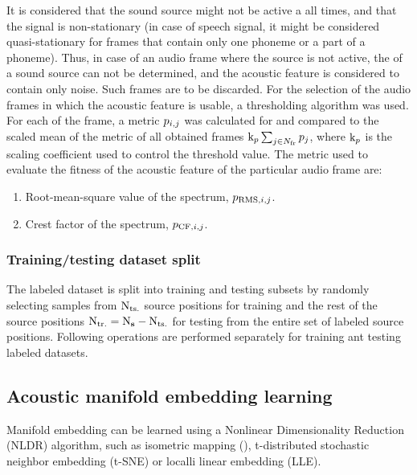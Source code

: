 \documentclass[applsci,article,submit,moreauthors,pdftex]{Definitions/mdpi}
\begin{document}
It is considered that the sound source might not be active a all times, and that the signal is non-stationary (in case of speech signal, it might be considered quasi-stationary for frames that contain only one phoneme or a part of a phoneme). Thus, in case of an audio frame where the source is not active, the \doa{} of a sound source can not be determined, and the acoustic feature is considered to contain only noise. Such frames are to be discarded. For the selection of the audio frames in which the acoustic feature is usable, a thresholding algorithm was used. For each of the frame, a metric 
$ p{}_{i,j} $ 
was calculated for and compared to the scaled mean  of the metric of all obtained frames 
$ \mathrm{k}_{p} \sum_{j\in N_{\mathrm{fr}}} p{}_{j}  $, 
where $ \mathrm{k}_{p} $ is the scaling coefficient used to control the threshold value.
The metric used to evaluate the fitness of the acoustic feature of the particular audio frame are: 
\begin{enumerate}
	\item Root-mean-square  value of the \srpphat{} spectrum, $ p_{\mathrm{RMS},i,j} $.
	\item Crest factor of the \srpphat{} spectrum, $ p_{\mathrm{CF},i,j} $.
\end{enumerate}


\subsubsection{Training/testing dataset split}
The labeled dataset is split into training and testing subsets by randomly selecting samples from  $ \mathrm{N}_{\mathrm{ts.}} $ source positions for training and the rest of the source positions $ \mathrm{N}_{\mathrm{tr.}} = \mathrm{N}_{\mathbf{s}} - \mathrm{N}_{\mathrm{ts.}} $ for testing from the entire set of labeled source positions.
Following operations are performed separately for training ant testing labeled datasets.

\subsection{Acoustic manifold embedding learning}

Manifold embedding can be learned using a Nonlinear Dimensionality Reduction (NLDR) algorithm, such as isometric mapping (\isomap{}), t-distributed stochastic neighbor embedding (t-SNE) or localli linear embedding (LLE). 
\end{document}
